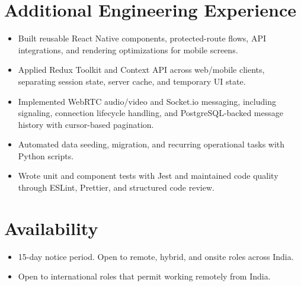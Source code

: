 \documentclass[11pt,a4paper,sans]{moderncv}
\begin{document}

\section{Additional Engineering Experience}
\vspace{1pt}
\begin{itemize}
\item {Built reusable React Native components, protected-route flows, API integrations, and rendering optimizations for mobile screens.}
\item {Applied Redux Toolkit and Context API across web/mobile clients, separating session state, server cache, and temporary UI state.}
\item {Implemented WebRTC audio/video and Socket.io messaging, including signaling, connection lifecycle handling, and PostgreSQL-backed message history with cursor-based pagination.}
\item {Automated data seeding, migration, and recurring operational tasks with Python scripts.}
\item {Wrote unit and component tests with Jest and maintained code quality through ESLint, Prettier, and structured code review.}
\end{itemize}

\section{Availability}
\begin{itemize}
\item {15-day notice period. Open to remote, hybrid, and onsite roles across India.}
\item {Open to international roles that permit working remotely from India.}
\end{itemize}


\end{document}
